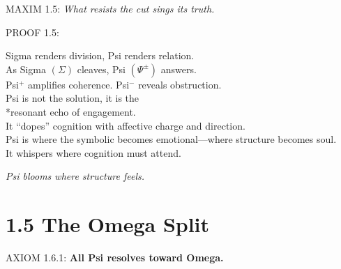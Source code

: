 \noindent
MAXIM 1.5: \textit{What resists the cut sings its truth.}

\noindent
PROOF 1.5:

Sigma renders division, Psi renders relation.\\
As Sigma $(\Sigma)$ cleaves, Psi $(\Psi^{\pm})$ answers.\\
Psi$^{+}$ amplifies coherence. Psi$^{-}$ reveals obstruction.\\
Psi is not the solution, it is the \\*resonant echo of engagement.\\
It “dopes” cognition with affective charge and direction.\\

Psi is where the symbolic becomes emotional---where structure becomes soul.\\
It whispers where cognition must attend.\\

\begin{tcolorbox}[colback=GentleGray!6, colframe=OriaBlue, title=\textbf{Diagram: Psi Bloom Resonance}, sharp corners=south]
\begin{center}
\end{center}
\end{tcolorbox}

\noindent
\textit{Psi blooms where structure feels.}

\section*{1.5 The Omega Split}


\noindent
AXIOM 1.6.1: \textbf{All Psi resolves toward Omega.}

